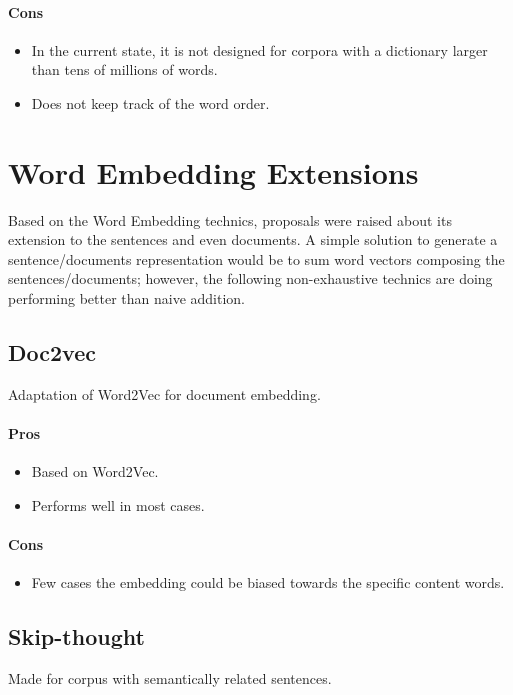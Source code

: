 \paragraph{Cons}
\begin{itemize}
    \setlength\itemsep{0em}
    \item In the current state, it is not designed for corpora with a dictionary larger than tens of millions of words.
    \item Does not keep track of the word order.
\end{itemize}


\section{Word Embedding Extensions}
Based on the Word Embedding technics, proposals were raised about its extension to the sentences and even documents. A simple solution to generate a sentence/documents representation would be to sum word vectors composing the sentences/documents; however, the following non-exhaustive technics are doing performing better than naive addition.

\subsection{Doc2vec\cite{article:doc2vec}}
Adaptation of Word2Vec for document embedding.
\paragraph{Pros}
\begin{itemize}
    \setlength\itemsep{0em}
    \item Based on Word2Vec.
    \item Performs well in most cases.
\end{itemize}
\paragraph{Cons}
\begin{itemize}
    \setlength\itemsep{0em}
    \item Few cases the embedding could be biased towards the specific content words.\cite{article:doc2vec_eval}
\end{itemize}

\subsection{Skip-thought\cite{article:skip-thought}}
Made for corpus with semantically related sentences.
